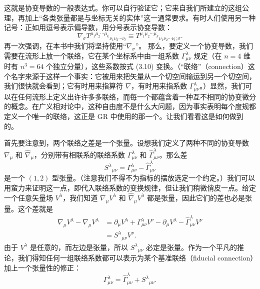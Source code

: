 这就是协变导数的一般表达式。你可以自行验证它；它来自我们所建立的这组公理，再加上“各类张量都是与坐标无关的实体”这一通常要求。有时人们使用另一种记号：正如用逗号表示偏导数，用分号表示协变导数：
\begin{equation*}
\nabla_\sigma T^{\mu_1\mu_2\cdots\mu_k}{}_{\nu_1\nu_2\cdots\nu_l} \equiv T^{\mu_1\mu_2\cdots\mu_k}{}_{\nu_1\nu_2\cdots\nu_l;\sigma}.
\tag{3.18}
\end{equation*}
再一次强调，在本书中我们将坚持使用“$\nabla_\sigma$”。
那么，要定义一个协变导数，我们需要在流形上放一个联络，它在某个坐标系中由一组系数 $\Gamma^\lambda_{\mu\nu}$ 规定（在 $n=4$ 维时有 $n^3=64$ 个独立分量），这些系数按式 (3.10) 变换。（“联络”（connection）这个名字来源于这样一个事实：它被用来把矢量从一个切空间输运到另一个切空间，我们很快就会看到；它有时用来指算符 $\nabla$，有时用来指系数 $\Gamma^\lambda_{\mu\nu}$。）显然，我们可以在任何流形上定义出许许多多联络，而每一个都蕴含着一种互不相同的协变微分的概念。在广义相对论中，这种自由度不是什么大问题，因为事实表明每个度规都定义一个唯一的联络，这正是 GR 中使用的那一个。让我们看看这是如何做到的。

首先要注意到，两个联络之差是一个张量。设想我们定义了两种不同的协变导数 $\nabla_\mu$ 和 $\widehat{\nabla}_\mu$，分别带有相联系的联络系数 $\Gamma^\lambda_{\mu\nu}$ 和 $\widehat{\Gamma}^\lambda_{\mu\nu}$。那么差
\begin{equation*}
S^\lambda{}_{\mu\nu} = \Gamma^\lambda_{\mu\nu} - \widehat{\Gamma}^\lambda_{\mu\nu}
\tag{3.19}
\end{equation*}
是一个 $(1,2)$ 型张量。（注意我们不得不为指标的摆放选定一个约定。）我们可以用蛮力来证明这一点，即代入联络系数的变换规律，但让我们稍微俏皮一点。给定一个任意矢量场 $V^\lambda$，我们知道 $\nabla_\mu V^\lambda$ 和 $\widehat{\nabla}_\mu V^\lambda$ 都是张量，因此它们的差也必是张量。这个差就是
\begin{align*}
\nabla_\mu V^\lambda - \widehat{\nabla}_\mu V^\lambda &= \partial_\mu V^\lambda + \Gamma^\lambda_{\mu\nu}V^\nu - \partial_\mu V^\lambda - \widehat{\Gamma}^\lambda_{\mu\nu}V^\nu\\
&= S^\lambda{}_{\mu\nu}V^\nu.
\tag{3.20}
\end{align*}
由于 $V^\lambda$ 是任意的，而左边是张量，所以 $S^\lambda{}_{\mu\nu}$ 必定是张量。作为一个平凡的推论，我们得知任何一组联络系数都可以表示为某个基准联络（fiducial connection）加上一个张量性的修正：
\begin{equation*}
\Gamma^\lambda_{\mu\nu} = \widehat{\Gamma}^\lambda_{\mu\nu} + S^\lambda{}_{\mu\nu}.
\tag{3.21}
\end{equation*}

